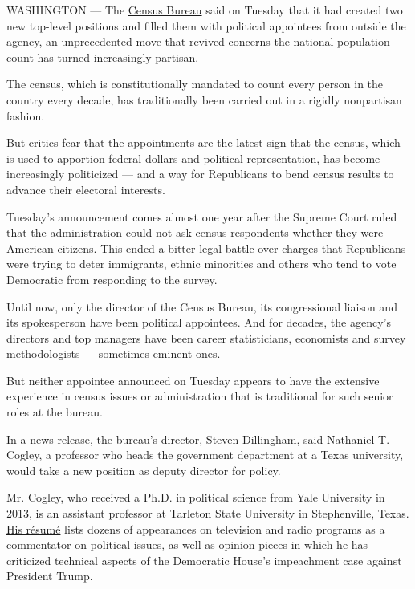WASHINGTON --- The
\href{https://www.nytimes.com/2020/07/28/us/trump-census.html}{Census
Bureau} said on Tuesday that it had created two new top-level positions
and filled them with political appointees from outside the agency, an
unprecedented move that revived concerns the national population count
has turned increasingly partisan.

The census, which is constitutionally mandated to count every person in
the country every decade, has traditionally been carried out in a
rigidly nonpartisan fashion.

But critics fear that the appointments are the latest sign that the
census, which is used to apportion federal dollars and political
representation, has become increasingly politicized --- and a way for
Republicans to bend census results to advance their electoral interests.

Tuesday's announcement comes almost one year after the Supreme Court
ruled that the administration could not ask census respondents whether
they were American citizens. This ended a bitter legal battle over
charges that Republicans were trying to deter immigrants, ethnic
minorities and others who tend to vote Democratic from responding to the
survey.

Until now, only the director of the Census Bureau, its congressional
liaison and its spokesperson have been political appointees. And for
decades, the agency's directors and top managers have been career
statisticians, economists and survey methodologists --- sometimes
eminent ones.

But neither appointee announced on Tuesday appears to have the extensive
experience in census issues or administration that is traditional for
such senior roles at the bureau.

\href{https://www.census.gov/newsroom/press-releases/2020/statement-new-staff.html}{In
a news release}, the bureau's director, Steven Dillingham, said
Nathaniel T. Cogley, a professor who heads the government department at
a Texas university, would take a new position as deputy director for
policy.

Mr. Cogley, who received a Ph.D. in political science from Yale
University in 2013, is an assistant professor at Tarleton State
University in Stephenville, Texas.
\href{http://nathanielcogley.com/Nathaniel-Terence-Cogley-CV.pdf}{His
résumé} lists dozens of appearances on television and radio programs as
a commentator on political issues, as well as opinion pieces in which he
has criticized technical aspects of the Democratic House's impeachment
case against President Trump.

